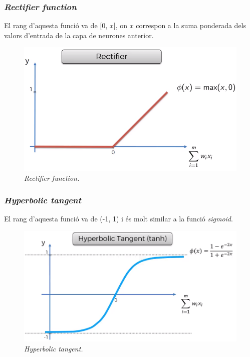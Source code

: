 \documentclass[12pt]{article}
\begin{document}
\subsubsection{\textit{Rectifier function}}
El rang d'aquesta funció va de [0, $x$], on $x$ correspon a la suma ponderada dels valors d'entrada de la capa de neurones anterior.
\begin{figure}[h!]
	\centering
	\includegraphics[scale=0.3]{imatges/fa/3rectifier.png}
	\caption{\textit{Rectifier function.}}
\end{figure}

\subsubsection{\textit{Hyperbolic tangent}}
El rang d'aquesta funció va de (-1, 1) i és molt similar a la funció \textit{sigmoid}.
\begin{figure}[h!]
	\centering
	\includegraphics[scale=0.3]{imatges/fa/4tanh.png}
	\caption{\textit{Hyperbolic tangent.}}
\end{figure}
\end{document}
